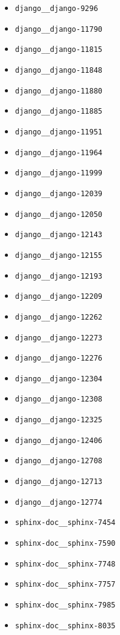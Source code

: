 \begin{multicols}{2}
\begin{itemize}
  \item \texttt{django\_\_django-9296}
  \item \texttt{django\_\_django-11790}
  \item \texttt{django\_\_django-11815}
  \item \texttt{django\_\_django-11848}
  \item \texttt{django\_\_django-11880}
  \item \texttt{django\_\_django-11885}
  \item \texttt{django\_\_django-11951}
  \item \texttt{django\_\_django-11964}
  \item \texttt{django\_\_django-11999}
  \item \texttt{django\_\_django-12039}
  \item \texttt{django\_\_django-12050}
  \item \texttt{django\_\_django-12143}
  \item \texttt{django\_\_django-12155}
  \item \texttt{django\_\_django-12193}
  \item \texttt{django\_\_django-12209}
  \item \texttt{django\_\_django-12262}
  \item \texttt{django\_\_django-12273}
  \item \texttt{django\_\_django-12276}
  \item \texttt{django\_\_django-12304}
  \item \texttt{django\_\_django-12308}
  \item \texttt{django\_\_django-12325}
  \item \texttt{django\_\_django-12406}
  \item \texttt{django\_\_django-12708}
  \item \texttt{django\_\_django-12713}
  \item \texttt{django\_\_django-12774}
  \item \texttt{sphinx-doc\_\_sphinx-7454}
  \item \texttt{sphinx-doc\_\_sphinx-7590}
  \item \texttt{sphinx-doc\_\_sphinx-7748}
  \item \texttt{sphinx-doc\_\_sphinx-7757}
  \item \texttt{sphinx-doc\_\_sphinx-7985}
  \item \texttt{sphinx-doc\_\_sphinx-8035}

\end{itemize}
\end{multicols}
